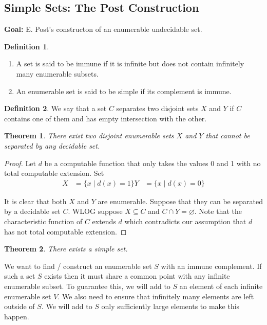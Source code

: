 \documentclass[10pt, letterpaper]{article}
\newtheorem{thm}{Theorem}
\theoremstyle{remark}
\theoremstyle{definition}
\newtheorem{defn}{Definition}
\begin{document}
    \subsection*{Simple Sets: The Post Construction}

    \textbf{Goal: } E. Post's constructon of an enumerable undecidable set. 

    \begin{defn}
        \begin{enumerate}
            \item A set is said to be immune if it is infinite but does not contain infinitely many enumerable subsets.
            \item An enumerable set is said to be simple if its complement is immune.
        \end{enumerate}
    \end{defn}

    \begin{defn}
        We say that a set $C$ separates two disjoint sets $X$ and $Y$ if $C$ contains one of them and has empty intersection 
        with the other.
    \end{defn}

    \begin{thm}
        There exist two disjoint enumerable sets $X$ and $Y$ that cannot be separated by any decidable set.
    \end{thm}

    \begin{proof}
        Let $d$ be a computable function that only takes the values 0 and 1 with no total computable extension. Set 
        \begin{align*}
            X &= \{x \mid d(x) = 1\}
            Y &= \{x \mid d(x) = 0\}
        \end{align*}

        It is clear that both $X$ and $Y$ are enumerable. Suppose that they can be separated by a decidable set $C$.
        WLOG suppose $X \subseteq C$ and $C \cap Y = \varnothing$. Note that the characteristic function of $C$ extends $d$ which 
        contradicts our assumption that $d$ has not total computable extension.
    \end{proof}

    \begin{thm}
        There exists a simple set.
    \end{thm}

    We want to find / construct an enumerable set $S$ with an immune complement. If such a set $S$ exists then it must share 
    a common point with any infinite enumerable subset. To guarantee this, we will add to $S$ an element of each infinite enumerable 
    set $V$. We also need to ensure that infinitely many elements are left outside of $S$. We will add to $S$ only sufficiently 
    large elements to make this happen.
\end{document}
